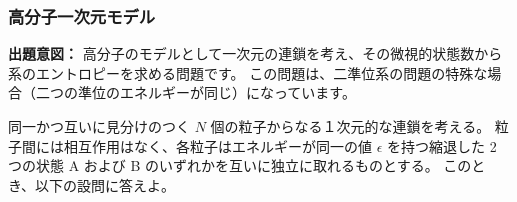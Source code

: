 \documentclass[uplatex,dvipdfmx,a4paper,11pt]{jsarticle}
\begin{document}
\newpage



\subsubsection{高分子一次元モデル}

\begin{boxnote}
{\bf 出題意図：}
高分子のモデルとして一次元の連鎖を考え、その微視的状態数から系のエントロピーを求める問題です。
この問題は、二準位系の問題の特殊な場合（二つの準位のエネルギーが同じ）になっています。
\end{boxnote}
\vspace{8pt}
同一かつ互いに見分けのつく $N$ 個の粒子からなる１次元的な連鎖を考える。
粒子間には相互作用はなく、各粒子はエネルギーが同一の値 $\epsilon$ を持つ縮退した 2 つの状態 A および B のいずれかを互いに独立に取れるものとする。
このとき、以下の設問に答えよ。
\end{document}
